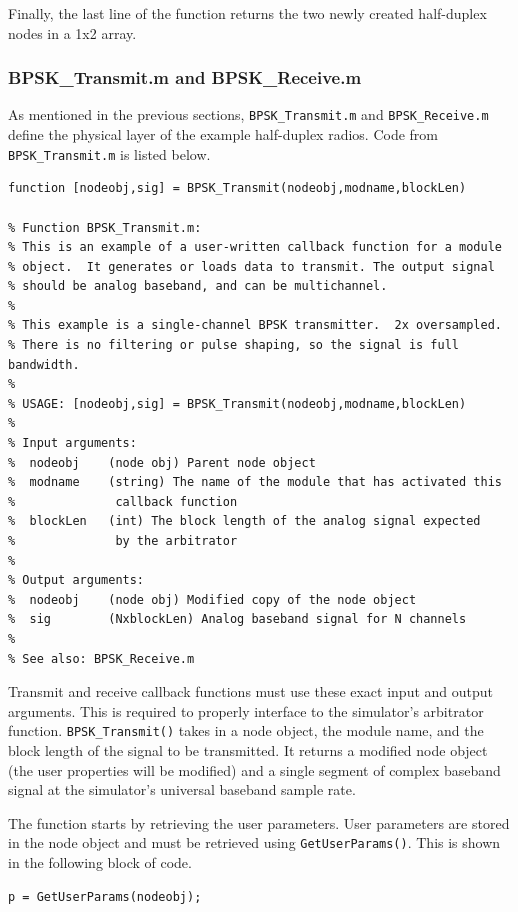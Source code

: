 Finally, the last line of the function returns the two newly created
half-duplex nodes in a 1x2 array.

\subsubsection{BPSK\_Transmit.m and BPSK\_Receive.m}

As mentioned in the previous sections, \verb+BPSK_Transmit.m+ and
\verb+BPSK_Receive.m+ define the physical layer of the example
half-duplex radios.  Code from \verb+BPSK_Transmit.m+ is listed
below.

\begin{lstlisting}[name=bpskTx]
function [nodeobj,sig] = BPSK_Transmit(nodeobj,modname,blockLen)

% Function BPSK_Transmit.m:
% This is an example of a user-written callback function for a module
% object.  It generates or loads data to transmit. The output signal
% should be analog baseband, and can be multichannel.
%
% This example is a single-channel BPSK transmitter.  2x oversampled.
% There is no filtering or pulse shaping, so the signal is full bandwidth.
%
% USAGE: [nodeobj,sig] = BPSK_Transmit(nodeobj,modname,blockLen)
%
% Input arguments:
%  nodeobj    (node obj) Parent node object
%  modname    (string) The name of the module that has activated this
%              callback function
%  blockLen   (int) The block length of the analog signal expected
%              by the arbitrator
%
% Output arguments:
%  nodeobj    (node obj) Modified copy of the node object
%  sig        (NxblockLen) Analog baseband signal for N channels
%
% See also: BPSK_Receive.m
\end{lstlisting}

Transmit and receive callback functions must use these exact input
and output arguments.  This is required to properly interface to the
simulator's arbitrator function.  \verb+BPSK_Transmit()+ takes in a
node object, the module name, and the block length of the signal to
be transmitted.  It returns a modified node object (the user
properties will be modified) and a single segment of complex
baseband signal at the simulator's universal baseband sample rate.

The function starts by retrieving the user parameters.  User
parameters are stored in the node object and must be retrieved using
\verb+GetUserParams()+.  This is shown in the following block of
code.

\begin{lstlisting}[firstnumber=31, name=bpskTx]
% Load user parameters
p = GetUserParams(nodeobj);

\end{lstlisting}

